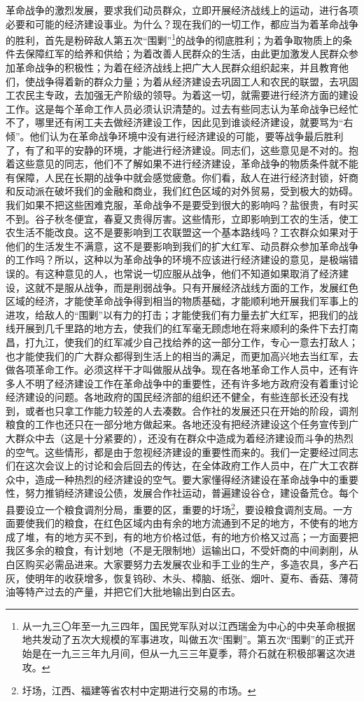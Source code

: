 \documentclass[cn,11pt,chinese]{elegantbook}
\begin{document}
革命战争的激烈发展，要求我们动员群众，立即开展经济战线上的运动，进行各项必要和可能的经济建设事业。为什么？现在我们的一切工作，都应当为着革命战争的胜利，首先是粉碎敌人第五次“围剿”\footnote[1]{ 从一九三〇年至一九三四年，国民党军队对以江西瑞金为中心的中央革命根据地共发动了五次大规模的军事进攻，叫做五次“围剿”。第五次“围剿”的正式开始是在一九三三年九月间，但从一九三三年夏季，蒋介石就在积极部署这次进攻。}的战争的彻底胜利；为着争取物质上的条件去保障红军的给养和供给；为着改善人民群众的生活，由此更加激发人民群众参加革命战争的积极性；为着在经济战线上把广大人民群众组织起来，并且教育他们，使战争得着新的群众力量；为着从经济建设去巩固工人和农民的联盟，去巩固工农民主专政，去加强无产阶级的领导。为着这一切，就需要进行经济方面的建设工作。这是每个革命工作人员必须认识清楚的。过去有些同志认为革命战争已经忙不了，哪里还有闲工夫去做经济建设工作，因此见到谁谈经济建设，就要骂为“右倾”。他们认为在革命战争环境中没有进行经济建设的可能，要等战争最后胜利了，有了和平的安静的环境，才能进行经济建设。同志们，这些意见是不对的。抱着这些意见的同志，他们不了解如果不进行经济建设，革命战争的物质条件就不能有保障，人民在长期的战争中就会感觉疲惫。你们看，敌人在进行经济封锁，奸商和反动派在破坏我们的金融和商业，我们红色区域的对外贸易，受到极大的妨碍。我们如果不把这些困难克服，革命战争不是要受到很大的影响吗？盐很贵，有时买不到。谷子秋冬便宜，春夏又贵得厉害。这些情形，立即影响到工农的生活，使工农生活不能改良。这不是要影响到工农联盟这一个基本路线吗？工农群众如果对于他们的生活发生不满意，这不是要影响到我们的扩大红军、动员群众参加革命战争的工作吗？所以，这种以为革命战争的环境不应该进行经济建设的意见，是极端错误的。有这种意见的人，也常说一切应服从战争，他们不知道如果取消了经济建设，这就不是服从战争，而是削弱战争。只有开展经济战线方面的工作，发展红色区域的经济，才能使革命战争得到相当的物质基础，才能顺利地开展我们军事上的进攻，给敌人的“围剿”以有力的打击；才能使我们有力量去扩大红军，把我们的战线开展到几千里路的地方去，使我们的红军毫无顾虑地在将来顺利的条件下去打南昌，打九江，使我们的红军减少自己找给养的这一部分工作，专心一意去打敌人；也才能使我们的广大群众都得到生活上的相当的满足，而更加高兴地去当红军，去做各项革命工作。必须这样干才叫做服从战争。现在各地革命工作人员中，还有许多人不明了经济建设工作在革命战争中的重要性，还有许多地方政府没有着重讨论经济建设的问题。各地政府的国民经济部的组织还不健全，有些连部长还没有找到，或者也只拿工作能力较差的人去凑数。合作社的发展还只在开始的阶段，调剂粮食的工作也还只在一部分地方做起来。各地还没有把经济建设这个任务宣传到广大群众中去（这是十分紧要的），还没有在群众中造成为着经济建设而斗争的热烈的空气。这些情形，都是由于忽视经济建设的重要性而来的。我们一定要经过同志们在这次会议上的讨论和会后回去的传达，在全体政府工作人员中，在广大工农群众中，造成一种热烈的经济建设的空气。要大家懂得经济建设在革命战争中的重要性，努力推销经济建设公债，发展合作社运动，普遍建设谷仓，建设备荒仓。每个县要设立一个粮食调剂分局，重要的区，重要的圩场\footnote[2]{ 圩场，江西、福建等省农村中定期进行交易的市场。}，要设粮食调剂支局。一方面要使我们的粮食，在红色区域内由有余的地方流通到不足的地方，不使有的地方成了堆，有的地方买不到，有的地方价格过低，有的地方价格又过高；一方面要把我区多余的粮食，有计划地（不是无限制地）运输出口，不受奸商的中间剥削，从白区购买必需品进来。大家要努力去发展农业和手工业的生产，多造农具，多产石灰，使明年的收获增多，恢复钨砂、木头、樟脑、纸张、烟叶、夏布、香菇、薄荷油等特产过去的产量，并把它们大批地输出到白区去。\\
\end{document}

